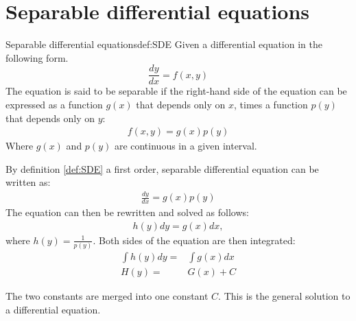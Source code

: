 \section{Separable differential equations}\label{SepDiff}
\begin{definition}{Separable differential equations}{def:SDE}
Given a differential equation in the following form. 
$$\frac{dy}{dx} = f(x,y)$$
The equation is said to be separable if the right-hand side of the equation can be expressed as a function $g(x)$ that depends only on $x$, times a function $p(y)$ that depends only on $y$:
\begin{align}
f(x,y)=g(x)p(y)
\end{align}
Where $g(x)$ and $p(y)$ are continuous in a given interval.
\end{definition}
\noindent
By definition \ref{def:SDE} a first order, separable differential equation can be written as:
\begin{align}
	\frac{dy}{dx}=g(x)p(y)
\end{align}
The equation can then be rewritten and solved as follows:
\begin{align}
	h(y)dy=g(x)dx,
\end{align}
where $h(y) = \frac{1}{p(y)}$. Both sides of the equation are then integrated:
 \begin{align}
 	\int h(y)dy =&\int g(x)dx   \\
 	H(y)=&G(x)+C \label{SDEG}
 \end{align}
 
The two constants are merged into one constant $C$. This is the general solution to a differential equation. \cite{diffandcomplex}


